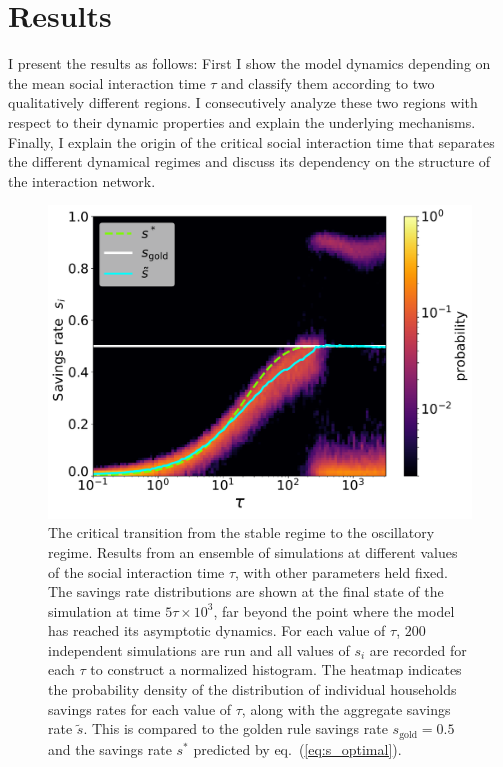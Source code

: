 \section{Results}
\label{sec:savings_results}
I present the results as follows: First I show the model dynamics depending on the mean social interaction time $\tau$ and classify them according to two qualitatively different regions. I consecutively analyze these two regions with respect to their dynamic properties and explain the underlying mechanisms. Finally, I explain the origin of the critical social interaction time that separates the different dynamical regimes and discuss its dependency on the structure of the interaction network.\\
\begin{figure}[ht]
     \centering
     \vspace{-.2 cm}
     \includegraphics[width=.9\linewidth]{figures/fig1.pdf}
	\caption []{{ The critical transition from the stable regime to the oscillatory regime.} 
	 Results from an ensemble of simulations at different values of the social interaction time $\tau$, with other parameters held fixed. The savings rate distributions are shown at the final state of the simulation at time $5\tau \times 10^3$, far beyond the point where the model has reached its asymptotic dynamics. For each value of $\tau$, $200$ independent simulations are run and all values of $s_i$ are recorded for each $\tau$ to construct a normalized histogram.
       The heatmap indicates the probability density of the distribution of individual households savings rates for each value of $\tau$, along with the aggregate savings rate $\tilde{s}$. This is compared to the golden rule savings rate $s_\mathrm{gold} \! = 0.5$ and the savings rate $s^*$ predicted by eq.~(\ref{eq:s_optimal}).}
	
   \label{phase}
\end{figure}
